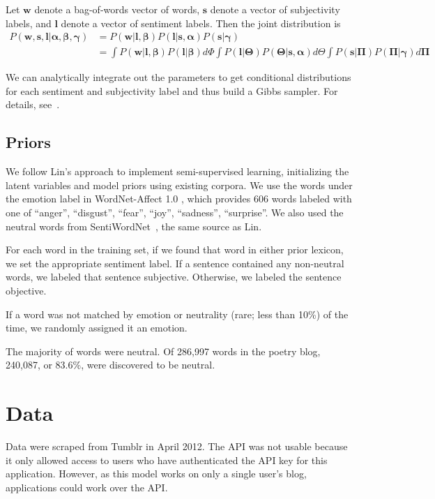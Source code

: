 \documentclass{article}
\begin{document}
Let $\mathbf{w}$ denote a bag-of-words vector of words, $\mathbf{s}$
denote a vector of subjectivity labels, and $\mathbf{l}$ denote a vector
of sentiment labels. Then the joint distribution is
\begin{equation}
\begin{aligned}
P(\mathbf{w,s,l}|\mathbf{\alpha,\beta,\gamma}) &= P(\mathbf{w}|\mathbf{l,\beta})P(\mathbf{l}|\mathbf{s,\alpha})P(\mathbf{s}|\mathbf{\gamma}) \\
    &= \int P(\mathbf{w}|\mathbf{l,\beta})P(\mathbf{l}|\mathbf{\beta}) d\Phi \int P(\mathbf{l}|\mathbf{\Theta})P(\mathbf{\Theta}|\mathbf{s,\alpha})d\Theta \int P(\mathbf{s}|\mathbf{\Pi})P(\mathbf{\Pi}|\mathbf{\gamma}) d\mathbf{\Pi}
\end{aligned}
\end{equation}

We can analytically integrate out the parameters to get conditional
distributions for each sentiment and subjectivity label and thus
build a Gibbs sampler. For details, see~\citep{lin03}.

\subsection{Priors}
\label{sec:priors}
We follow Lin's approach to implement semi-supervised learning,
initializing the latent variables and model priors using existing
corpora. We use the words under the {\sc emotion} label in
WordNet-Affect 1.0 \citep{strapparava04}, which provides 606 words
labeled with one of ``anger'', ``disgust'', ``fear'', ``joy'',
``sadness'', ``surprise''. We also used the neutral words from
SentiWordNet~\citep{baccianella10}, the same source as Lin.

For each word in the training set, if we found that word in either
prior lexicon, we set the appropriate sentiment label. If a sentence
contained any non-neutral words, we labeled that sentence subjective.
Otherwise, we labeled the sentence objective.

If a word was not matched by emotion or neutrality (rare; less than
10\%) of the time, we randomly assigned it an emotion.

The majority of words were neutral. Of 286,997 words in the 
poetry blog, 240,087, or 83.6\%, were discovered to be neutral.

\section{Data}
Data were scraped from Tumblr in April 2012. The API
was not usable because it only allowed access to users who have
authenticated the API key for this application. However, as this
model works on only a single user's blog, applications could work
over the API.
\end{document}

